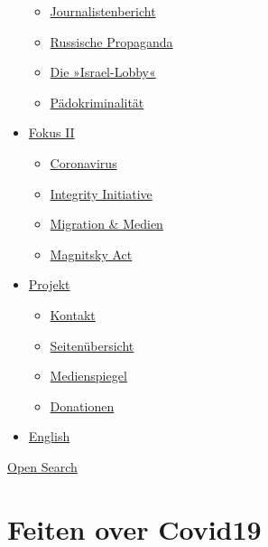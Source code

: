 \begin{itemize}
  \begin{itemize}
  \tightlist
  \item
    \href{https://swprs.org/bericht-eines-journalisten/}{Journalistenbericht}
  \item
    \href{https://swprs.org/russische-propaganda/}{Russische Propaganda}
  \item
    \href{https://swprs.org/die-israel-lobby-fakten-und-mythen/}{Die
    »Israel-Lobby«}
  \item
    \href{https://swprs.org/geopolitik-und-paedokriminalitaet/}{Pädokriminalität}
  \end{itemize}
\item
  \href{https://swprs.org/migration-und-medien/}{Fokus II}

  \begin{itemize}
  \tightlist
  \item
    \href{https://swprs.org/covid-19-hinweis-ii/}{Coronavirus}
  \item
    \href{https://swprs.org/die-integrity-initiative/}{Integrity
    Initiative}
  \item
    \href{https://swprs.org/migration-und-medien/}{Migration \& Medien}
  \item
    \href{https://swprs.org/der-fall-magnitsky/}{Magnitsky Act}
  \end{itemize}
\item
  \href{https://swprs.org/kontakt/}{Projekt}

  \begin{itemize}
  \tightlist
  \item
    \href{https://swprs.org/kontakt/}{Kontakt}
  \item
    \href{https://swprs.org/uebersicht/}{Seitenübersicht}
  \item
    \href{https://swprs.org/medienspiegel/}{Medienspiegel}
  \item
    \href{https://swprs.org/donationen/}{Donationen}
  \end{itemize}
\item
  \href{https://swprs.org/contact/}{English}
\end{itemize}

\protect\hyperlink{}{Open Search}

\hypertarget{feiten-over-covid19}{%
\section{Feiten over Covid19}\label{feiten-over-covid19}}

